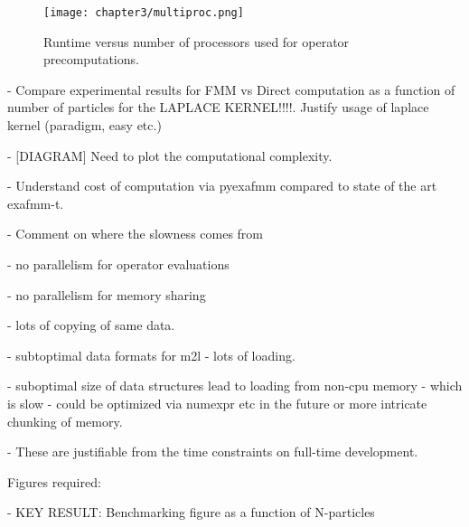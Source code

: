 \begin{figure}[ht]
    \centering

  {\texttt{[image: chapter3/multiproc.png]}}
  \vspace{0pt}
    \caption{Runtime versus number of processors used for operator precomputations.}
    \label{fig:3_1_multiproc}
\end{figure}


- Compare experimental results for FMM vs Direct computation as a function of number of particles for the LAPLACE KERNEL!!!!. Justify usage of laplace kernel (paradigm, easy etc.)

- [DIAGRAM] Need to plot the computational complexity.

- Understand cost of computation via pyexafmm compared to state of the art exafmm-t.

- Comment on where the slowness comes from

- no parallelism for operator evaluations

- no parallelism for memory sharing

- lots of copying of same data.

- subtoptimal data formats for m2l - lots of loading.

- suboptimal size of data structures lead to loading from non-cpu memory - which is slow - could be optimized via numexpr etc in the future or more intricate chunking of memory.

- These are justifiable from the time constraints on full-time development.

Figures required:

- KEY RESULT: Benchmarking figure as a function of N-particles

